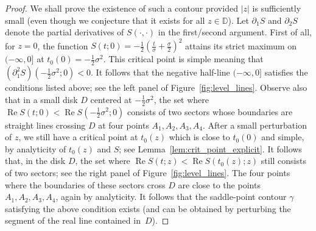 \documentclass[AHL,Unicode,longabstracts,published]{cedram}
\DeclareMathOperator{\Ree}{Re}
\newcommand{\bD}{\mathbb{D}}
\begin{document}
\begin{proof}
We shall prove the existence of such a contour provided $|z|$ is sufficiently small (even though we conjecture that it exists for all $z\in \bD$). Let $\partial_1 S$ and $\partial_2 S$ denote the partial derivatives of $S(\cdot, \cdot)$ in the first/second argument. First of all, for $z=0$, the function $S(t;0) = - \frac 12 (\frac{t}{\sigma} + \frac \sigma 2)^2$ attains its strict maximum on $(-\infty, 0]$ at $t_0(0) = -\frac 12 \sigma^2$. This critical point is simple meaning that $(\partial_1^2 S)(-\frac 12 \sigma^2;0) < 0$. It follows that the negative half-line $(-\infty, 0]$ satisfies the conditions listed above; see the left panel of Figure~\ref{fig:level_lines}. Observe also that in a small disk $D$ centered at $-\frac 12 \sigma^2$, the set where $\Ree S(t;0) < \Ree S(-\frac 12 \sigma^2;0)$ consists of two sectors whose boundaries are straight lines crossing $D$ at four points $A_1, A_2, A_3, A_4$. After a small perturbation of $z$, we still have a critical point at $t_0(z)$ which is close to $t_0(0)$ and simple, by analyticity of $t_0(z)$ and $S$; see Lemma~\ref{lem:crit_point_explicit}. It follows that, in the disk $D$, the set where $\Ree S(t;z) < \Ree S(t_0(z);z)$ still consists of two sectors; see the right panel of Figure~\ref{fig:level_lines}. The four points where the boundaries of these sectors cross $D$ are close to the points $A_1,A_2,A_3,A_4$, again by analyticity. It follows that the saddle-point contour $\gamma$ satisfying the above condition exists (and can be obtained by perturbing the segment of the real line contained in~$D$).



\end{proof}
\end{document}
